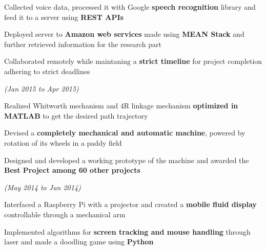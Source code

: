 \documentclass[a4paper]{deedy-resume} %
\begin{document}
\begin{tightitemize}
\item  Collected voice data, processed it with Google \textbf{speech recognition} library and feed it to a server using \textbf{REST APIs}
\item  Deployed server to \textbf{Amazon web services} made using \textbf{MEAN Stack} and further retrieved information for the research part
\item  Collaborated remotely while maintaning a \textbf{strict timeline} for project completion adhering to strict deadlines
\microspace

\end{tightitemize}



\hfill {\textit{\small(Jan 2015 to Apr 2015)}}\\
\begin{tightitemize}
\item Realized Whitworth mechanism and 4R linkage mechanism \textbf{optimized in MATLAB}  to get the desired path trajectory
\item Devised a \textbf{completely mechanical and automatic machine}, powered by rotation of its wheels in a paddy field
\item Designed and developed a working prototype of the machine and awarded the \textbf{Best Project among 60 other projects}
\end{tightitemize}


\microspace

\hfill {\textit{\small(May 2014 to Jun 2014)}}\\

\begin{tightitemize}
\item Interfaced a Raspberry Pi with a projector and created a \textbf{mobile fluid display} controllable through a mechanical arm
\item Implemented algorithms for \textbf{screen tracking and mouse handling} through  laser and made a doodling game using \textbf{Python}
\end{tightitemize}
\sectionspace
\end{document}
